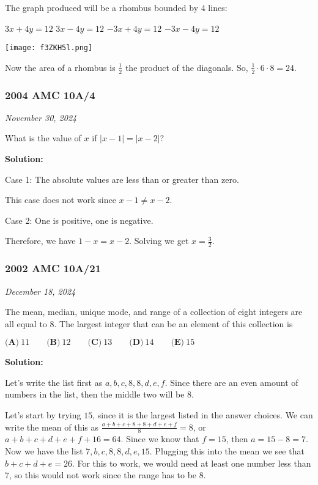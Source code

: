 \documentclass[../mathproblems.tex]{subfiles}
\begin{document}
The graph produced will be a rhombus bounded by 4 lines:

$3x+4y=12$
$3x-4y =12$
$-3x+4y=12$
$-3x-4y=12$

\begin{center}
    \texttt{[image: f3ZKH5l.png]}
\end{center}

Now the area of a rhombus is $\frac{1}{2}$ the product of the diagonals. So, $\frac{1}{2}\cdot 6 \cdot 8 = \boxed{24}$.

\noindent\hrulefill
\subsubsection*{2004 AMC 10A/4} 
\textit{November 30, 2024}

What is the value of $x$ if $|x-1|=|x-2|$?

\textbf{Solution:}

Case 1: The absolute values are less than or greater than zero.

This case does not work since $x-1\neq x-2$.

Case 2: One is positive, one is negative.

Therefore, we have $1-x=x-2$. Solving we get $x=\boxed{\frac{3}{2}}$.

\noindent\hrulefill

\subsubsection*{2002 AMC 10A/21}
\textit{December 18, 2024}

The mean, median, unique mode, and range of a collection of eight integers are all equal to 8. The largest integer that can be an element of this collection is

$ \textbf{(A)}\ 11 \qquad \textbf{(B)}\ 12 \qquad \textbf{(C)}\ 13 \qquad \textbf{(D)}\ 14 \qquad \textbf{(E)}\ 15$

\textbf{Solution:}

Let's write the list first as $a,b,c,8,8,d,e,f$. Since there are an even amount of numbers in the list, then the middle two will be $8$.

Let's start by trying $15$, since it is the largest listed in the answer choices. We can write the mean of this as $\frac{a+b+c+8+8+d+e+f}{8} = 8$, or $a+b+c+d+e+f+16 = 64$. Since we know that $f=15$, then $a=15-8 = 7$. Now we have the list $7,b,c,8,8,d,e,15$. Plugging this into the mean we see that $b+c+d+e = 26$. For this to work, we would need at least one number less than $7$, so this would not work since the range has to be $8$.
\end{document}
